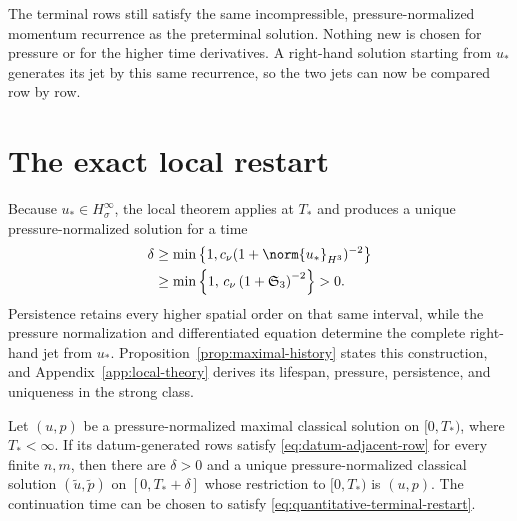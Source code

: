 The terminal rows still satisfy the same incompressible, pressure-normalized
momentum recurrence as the preterminal solution.  Nothing new is chosen for
pressure or for the higher time derivatives.  A right-hand solution starting
from \(u_*\) generates its jet by this same recurrence, so the two jets can now
be compared row by row.

\section{The exact local restart}
\label{sec:restart}

Because \(u_*\in H^\infty_\sigma\), the local theorem applies at \(T_*\) and
produces a unique pressure-normalized solution for a time
\begin{equation}
 \begin{aligned}
 \delta
 &\ge\min\left\{1,c_\nu(1+\norm{u_*}_{H^3})^{-2}\right\}\\
 &\ge\min\left\{
 1,\,
 c_\nu\left(1+\mathfrak S_3\right)^{-2}
 \right\}>0.
 \end{aligned}
 \label{eq:quantitative-terminal-restart}
\end{equation}
Persistence retains every higher spatial order on that same interval, while
the pressure normalization and differentiated equation determine the complete
right-hand jet from \(u_*\).  Proposition~\ref{prop:maximal-history} states
this construction, and Appendix~\ref{app:local-theory} derives its lifespan,
pressure, persistence, and uniqueness in the strong class.

\begin{theorem}
\label{thm:intersection-continuation}
Let \((u,p)\) be a pressure-normalized maximal classical solution on
\([0,T_*)\), where \(T_*<\infty\).  If its datum-generated rows satisfy
\eqref{eq:datum-adjacent-row} for every finite \(n,m\), then there are
\(\delta>0\) and a unique pressure-normalized classical solution
\((\widetilde u,\widetilde p)\) on \([0,T_*+\delta]\) whose restriction to
\([0,T_*)\) is \((u,p)\).  The continuation time can be chosen to satisfy
\eqref{eq:quantitative-terminal-restart}.
\end{theorem}

